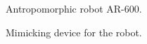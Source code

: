 \documentclass[letterpaper, 10 pt, conference]{ieeeconf}  %
\begin{document}
\begin{figure} [thpb]
      \centering
      \caption{Antropomorphic robot AR-600.}
      \label{img:ar600}
\end{figure}


\begin{figure} [thpb]
      \centering
      \caption{Mimicking device for the robot.}
      \label{img:suit}
\end{figure}
\end{document}
